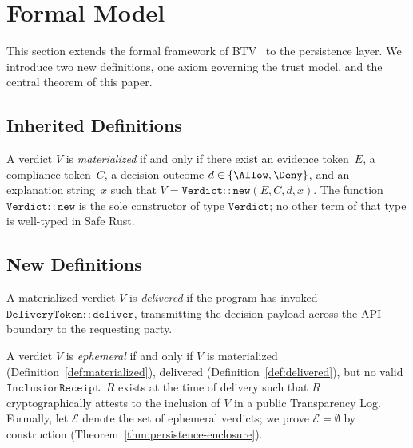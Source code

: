 \section{Formal Model}
\label{sec:formal}

This section extends the formal framework of BTV~\cite{btv2026} to the
persistence layer. We introduce two new definitions, one axiom governing the
trust model, and the central theorem of this paper.

\subsection{Inherited Definitions}

\begin{definition}
\label{def:materialized}
A verdict $V$ is \emph{materialized} if and only if there exist an evidence
token~$E$, a compliance token~$C$, a decision outcome $d \in \{\Allow,
\Deny\}$, and an explanation string~$x$ such that
$V = \mathtt{Verdict{::}new}(E, C, d, x)$.
The function $\mathtt{Verdict{::}new}$ is the sole constructor of type
$\mathtt{Verdict}$; no other term of that type is well-typed in Safe Rust.
\end{definition}

\subsection{New Definitions}

\begin{definition}
\label{def:delivered}
A materialized verdict $V$ is \emph{delivered} if the program has invoked
$\mathtt{DeliveryToken{::}deliver}$, transmitting the decision payload across
the API boundary to the requesting party.
\end{definition}

\begin{definition}
\label{def:ephemeral}
A verdict $V$ is \emph{ephemeral} if and only if $V$ is materialized
(Definition~\ref{def:materialized}), delivered (Definition~\ref{def:delivered}),
but no valid $\mathtt{InclusionReceipt}$~$R$ exists at the time of delivery
such that $R$ cryptographically attests to the inclusion of $V$ in a public
Transparency Log. Formally, let $\mathcal{E}$ denote the set of ephemeral
verdicts; we prove $\mathcal{E} = \emptyset$ by construction
(Theorem~\ref{thm:persistence-enclosure}).
\end{definition}

